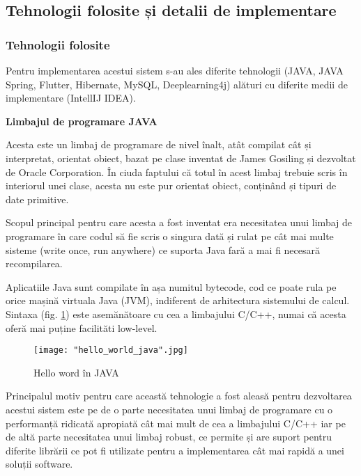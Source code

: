 \documentclass[a4paper, 12pt]{article}
\begin{document}
	\subsection{Tehnologii folosite și detalii de implementare}
	\bigskip
	\subsubsection{Tehnologii folosite}
	
	\quad\space\space Pentru implementarea acestui sistem s-au ales diferite tehnologii (JAVA, JAVA Spring, Flutter, Hibernate, MySQL, Deeplearning4j) alături cu diferite medii de implementare (IntellIJ IDEA).
	\bigskip
	
	\textbf{Limbajul de programare JAVA \cite{arnold2005java}}
	
	\qquad Acesta este un limbaj de programare de nivel înalt, atât compilat cât și interpretat, orientat obiect, bazat pe clase inventat de James Gosiling și dezvoltat de Oracle Corporation. În ciuda faptului că totul în acest limbaj trebuie scris în interiorul unei clase, acesta nu este pur orientat obiect, conținând și tipuri de date primitive.
	
	\qquad Scopul principal pentru care acesta a fost inventat era necesitatea unui limbaj de programare în care codul să fie scris o singura dată și rulat pe cât mai multe sisteme (write once, run anywhere) ce suporta Java fară a mai fi necesară recompilarea.
	
	\qquad Aplicatiile Java sunt compilate în așa numitul bytecode, cod ce poate rula pe orice mașină virtuala Java (JVM), indiferent de arhitectura sistemului de calcul. Sintaxa (fig. \ref{fig:java}) este asemănătoare cu cea a limbajului C/C++, numai că acesta oferă mai puține facilităti low-level. \textbf{\cite{arnold2005java}}
	
	\begin{figure}[H]
		\centering
		\texttt{[image: "hello\_world\_java".jpg]}
		\caption{Hello word în JAVA \cite{wikipedia_2019}}\label{fig:java}
	\end{figure}
	
	\qquad Principalul motiv pentru care această tehnologie a fost aleasă pentru dezvoltarea acestui sistem este pe de o parte necesitatea unui limbaj de programare cu o performanță ridicată apropiată cât mai mult de cea a limbajului C/C++ iar pe de altă parte necesitatea unui limbaj robust, ce permite și are suport pentru diferite librării ce pot fi utilizate pentru a implementarea cât mai rapidă a unei soluții software.
	\newpage
	
\end{document}
